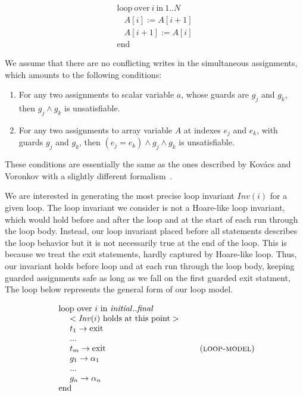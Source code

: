 \documentclass[a4paper,10pt]{article}
\newcommand{\idx}{\ensuremath{i}\xspace}
\newcommand{\idxinitial}{\ensuremath{\mathit{initial}}\xspace}
\newcommand{\idxfinal}{\ensuremath{\mathit{final}}\xspace}
\newcommand{\KWloop}{\ensuremath{\mathrm{loop}~}}
\newcommand{\KWend}{\ensuremath{\mathrm{end}~}}
\newcommand{\KWover}{\ensuremath{\mathrm{over}~}}
\newcommand{\KWin}{\ensuremath{~\mathrm{in}~}}
\newcommand{\KWexit}{\ensuremath{\mathrm{exit}}}
\newcommand{\Inv}[1]{\ensuremath{\mathit{Inv}(#1)\xspace}}
\newcommand{\loopmodel}{\textsc{loop-model}\xspace}
\begin{document}
$$\begin{array}{l}
  \KWloop \KWover i \KWin 1 .. N \\
  ~~~~ A[i]   := A[i+1]\\
  ~~~~ A[i+1] := A[i]\\
  \KWend
\end{array}$$

We assume that there are no conflicting writes in the simultaneous assignments,
which amounts to the following conditions:

\begin{enumerate}
\item For any two assignments to scalar variable $a$, whose guards are $g_j$
  and $g_k$, then $g_j \land g_k$ is unsatisfiable.
\item For any two assignments to array variable $A$ at indexes $e_j$ and $e_k$,
  with guards $g_j$ and $g_k$, then $(e_j = e_k) \land g_j \land g_k$ is
  unsatisfiable.
\end{enumerate}

These conditions are essentially the same as the ones described by Kov\'acs and
Voronkov with a slightly different formalism~\cite{kovacs:2009:fli}.

We are interested in generating the most precise loop invariant \Inv{\idx} for
a given loop. The loop invariant we consider is not a Hoare-like loop
invariant, which would hold before and after the loop and at the start of each
run through the loop body. Instead, our loop invariant placed before all statements
describes the loop behavior but it is not necessarily true at the end of the loop.
This is because we treat the exit statements, hardly captured by Hoare-like loop. 
Thus, our invariant holds before loop and at each run through the loop body, 
keeping guarded assignments safe as long as we fall on the first guarded exit statment,
The loop below represents the general form of our loop model.

\begin{align*}
\begin{array}{l}
  \KWloop \KWover i \KWin \idxinitial ..\idxfinal \\
  ~~~~ < \textrm{\Inv{\idx} holds at this point} >\\
  ~~~~ t_1 \rightarrow \KWexit \\
  ~~~~ ... \\
  ~~~~ t_m \rightarrow \KWexit \\
  ~~~~ g_1 \rightarrow \alpha_1 \\
  ~~~~ ... \\
  ~~~~ g_n \rightarrow \alpha_n \\
  \KWend
\end{array}
 \tag{\loopmodel}\\
\end{align*}
\end{document}
